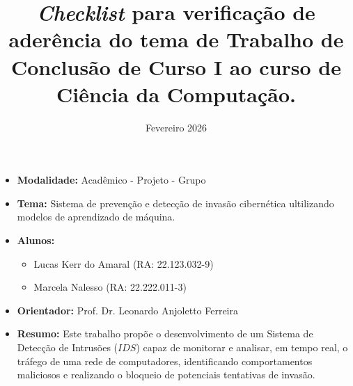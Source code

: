 \documentclass[11pt,a4,oneside]{article}
\title{\textit{Checklist} para verificação de aderência do tema de Trabalho de Conclusão de Curso I ao curso de Ciência da Computação.}
\date{Fevereiro 2026}
\begin{document}
\pagestyle{fancy}
\pagestyle{fancy}
\fancyhead{}

\maketitle
\begin{itemize}
\item \textbf{Modalidade:} Acadêmico - Projeto - Grupo
\item \textbf{Tema:} Sistema de prevenção e detecção de invasão cibernética ultilizando modelos de aprendizado de máquina.
\item \textbf{Alunos:}
\begin{itemize}
    \item Lucas Kerr do Amaral (RA: 22.123.032-9)
    \item Marcela Nalesso (RA: 22.222.011-3)
\end{itemize}
\item \textbf{Orientador:} Prof. Dr. Leonardo Anjoletto Ferreira
\item \textbf{Resumo: }Este trabalho propõe o desenvolvimento de um Sistema de Detecção de Intrusões ($IDS$) capaz de monitorar e analisar, em tempo real, o tráfego de uma rede de computadores, identificando comportamentos maliciosos e realizando o bloqueio de potenciais tentativas de invasão. 
\end{itemize}
\end{document}
